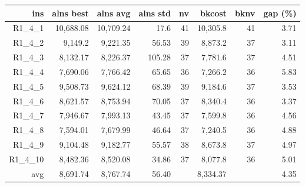   \begin{table}[caption={Kết quả đo với tập HG\_R\_1\_4 400 yêu cầu}, label=exp:HGR14]
    \small
    \centering
    \begin{tabular}{rrrrrrrr}
    \hline
    ins & alns best & alns avg & alns std & nv & bkcost & bknv & gap (\%) \\ \hline
    R1\_4\_1 & 10,688.08 & 10,709.24 & 17.6 & 41 & 10,305.8 & 41 & 3.71 \\ \hline
    R1\_4\_2 & 9,149.2 & 9,221.35 & 56.53 & 39 & 8,873.2 & 37 & 3.11 \\ \hline
    R1\_4\_3 & 8,132.17 & 8,226.37 & 105.28 & 37 & 7,781.6 & 37 & 4.51 \\ \hline
    R1\_4\_4 & 7,690.06 & 7,766.42 & 65.65 & 36 & 7,266.2 & 36 & 5.83 \\ \hline
    R1\_4\_5 & 9,508.73 & 9,624.12 & 68.39 & 39 & 9,184.6 & 37 & 3.53 \\ \hline
    R1\_4\_6 & 8,621.57 & 8,753.94 & 70.05 & 37 & 8,340.4 & 36 & 3.37 \\ \hline
    R1\_4\_7 & 7,946.67 & 7,993.13 & 43.45 & 37 & 7,599.8 & 36 & 4.56 \\ \hline
    R1\_4\_8 & 7,594.01 & 7,679.99 & 46.64 & 37 & 7,240.5 & 36 & 4.88 \\ \hline
    R1\_4\_9 & 9,104.48 & 9,182.77 & 55.57 & 38 & 8,673.8 & 37 & 4.97 \\ \hline
    R1\_4\_10 & 8,482.36 & 8,520.08 & 34.86 & 37 & 8,077.8 & 36 & 5.01 \\ \hline
    avg & 8,691.74 & 8,767.74 & 56.40 & & 8,334.37 & & 4.35 \\ \hline
    \end{tabular}
  \end{table}

